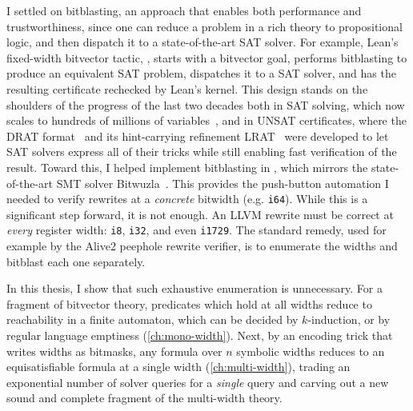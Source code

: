 \noindent I settled on bitblasting, an approach that enables both performance and trustworthiness,
since one can reduce a problem in a rich theory to propositional logic,
and then dispatch it to a state-of-the-art SAT solver.
For example, Lean's fixed-width bitvector tactic, \bvdecide{},
starts with a bitvector goal, performs bitblasting to produce an equivalent SAT problem,
dispatches it to a SAT solver,
and has the resulting certificate rechecked by Lean's kernel.
This design stands on the shoulders of the progress of the last two decades
both in SAT solving, which now scales to hundreds of millions of variables~\citep{biere2024cadical,kissatSATComp2024},
and in UNSAT certificates, where the DRAT format~\citep{heule2016drat} and its
hint-carrying refinement LRAT~\citep{cruz2017efficient} were developed to
let SAT solvers express all of their tricks while still enabling fast verification of the result.
Toward this, I helped implement bitblasting in \bvdecide{}, which mirrors the state-of-the-art SMT solver Bitwuzla~\citep{niemetz2023bitwuzla}.
This provides the push-button automation I needed to verify rewrites at a \emph{concrete} bitwidth (e.g. \texttt{i64}).
While this is a significant step forward, it is not enough.
An LLVM rewrite must be correct at \emph{every} register width: \texttt{i8}, \texttt{i32}, and even \texttt{i1729}.
The standard remedy, used for example by the Alive2 peephole rewrite verifier,
is to enumerate the widths and bitblast each one separately.

In this thesis, I show that such exhaustive enumeration is unnecessary.
For a fragment of bitvector theory, predicates which hold at all widths reduce to reachability in a finite automaton,
which can be decided by $k$-induction, or by regular language emptiness (\cref{ch:mono-width}).
Next, by an encoding trick that writes widths as bitmasks,
any formula over $n$ symbolic widths reduces to an equisatisfiable formula at a single width (\cref{ch:multi-width}),
trading an exponential number of solver queries for a \emph{single} query and carving out a new sound and complete fragment of the multi-width theory.

